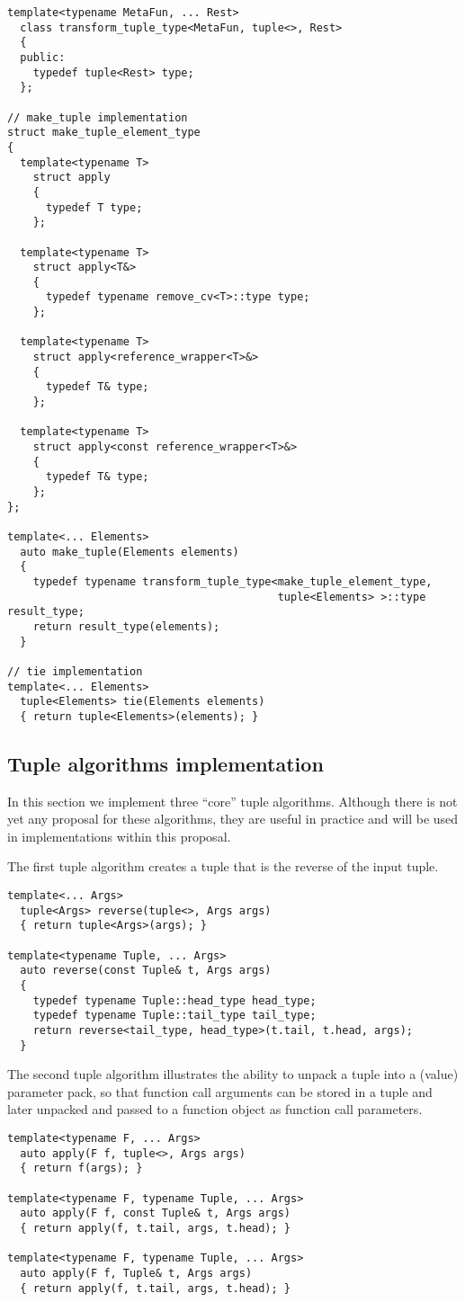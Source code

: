 \documentclass{article}
\begin{document}
\begin{verbatim}
template<typename MetaFun, ... Rest>
  class transform_tuple_type<MetaFun, tuple<>, Rest>
  {
  public:
    typedef tuple<Rest> type;
  };

// make_tuple implementation
struct make_tuple_element_type
{
  template<typename T> 
    struct apply
    {
      typedef T type;
    };

  template<typename T>
    struct apply<T&>
    {
      typedef typename remove_cv<T>::type type;
    };

  template<typename T>
    struct apply<reference_wrapper<T>&>
    {
      typedef T& type;
    };

  template<typename T>
    struct apply<const reference_wrapper<T>&>
    {
      typedef T& type;
    };
};

template<... Elements> 
  auto make_tuple(Elements elements)
  {
    typedef typename transform_tuple_type<make_tuple_element_type,
                                          tuple<Elements> >::type result_type; 
    return result_type(elements);
  }

// tie implementation
template<... Elements>
  tuple<Elements> tie(Elements elements)
  { return tuple<Elements>(elements); }
\end{verbatim}
\normalsize

\subsection{Tuple algorithms implementation}
In this section we implement three ``core'' tuple algorithms.
Although there is not yet any proposal for these algorithms, they are
useful in practice and will be used in implementations within this
proposal.

The first tuple algorithm creates a tuple that is the reverse of the
input tuple.
\begin{verbatim}
template<... Args>
  tuple<Args> reverse(tuple<>, Args args)
  { return tuple<Args>(args); }

template<typename Tuple, ... Args>
  auto reverse(const Tuple& t, Args args)
  { 
    typedef typename Tuple::head_type head_type;
    typedef typename Tuple::tail_type tail_type;
    return reverse<tail_type, head_type>(t.tail, t.head, args);
  }
\end{verbatim}

The second tuple algorithm illustrates the ability to unpack a tuple
into a (value) parameter pack, so that function call arguments can be
stored in a tuple and later unpacked and passed to a function object
as function call parameters.
\begin{verbatim}
template<typename F, ... Args>
  auto apply(F f, tuple<>, Args args)
  { return f(args); }

template<typename F, typename Tuple, ... Args>
  auto apply(F f, const Tuple& t, Args args)
  { return apply(f, t.tail, args, t.head); }

template<typename F, typename Tuple, ... Args>
  auto apply(F f, Tuple& t, Args args)
  { return apply(f, t.tail, args, t.head); }
\end{verbatim}
\end{document}
